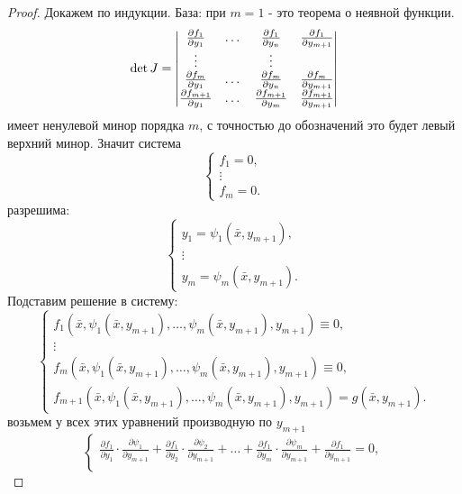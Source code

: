 \begin{proof}
    Докажем по индукции. База: при $m=1$ - это теорема о неявной функции.
    \[
        \det{J}=\begin{vmatrix}
            \frac{\partial {f_1}}{\partial {y_1}} & \dots & \frac{\partial {f_1}}{\partial {y_n}} & \frac{\partial {f_1}}{\partial {y_{m+1}}}\\
            \vdots & \null & \vdots\\
            \frac{\partial {f_m}}{\partial {y_1}} & \dots & \frac{\partial {f_m}}{\partial {y_n}} & \frac{\partial {f_m}}{\partial {y_{m+1}}}\\
            \frac{\partial {f_{m+1}}}{\partial {y_1}} & \dots & \frac{\partial {f_{m+1}}}{\partial {y_m}} & \frac{\partial {f_{m+1}}}{\partial {y_{m+1}}}
        \end{vmatrix}
    \]
    имеет ненулевой минор порядка $m$, с точностью до обозначений это будет левый верхний минор. Значит система
    \[\begin{cases}
        f_1 = 0,\\
        \vdots\\
        f_m=0.
    \end{cases}
    \]
    разрешима:
    \[\begin{cases}
        y_1=\psi_1(\bar{x},y_{m+1}),\\
        \vdots\\
        y_m=\psi_m(\bar{x}, y_{m+1}).
    \end{cases}
    \]
    Подставим решение в систему:
    \[\begin{cases}
        f_1(\bar{x}, \psi_1(\bar{x}, y_{m+1}), \dots, \psi_m(\bar{x}, y_{m+1}), y_{m+1})\equiv 0,\\
        \vdots\\
        f_m(\bar{x}, \psi_1(\bar{x}, y_{m+1}), \dots, \psi_m(\bar{x}, y_{m+1}), y_{m+1})\equiv 0,\\
        f_{m+1}(\bar{x}, \psi_1(\bar{x}, y_{m+1}),\dots,\psi_m(\bar{x}, y_{m+1}), y_{m+1})=g(\bar{x}, y_{m+1}).
    \end{cases}
    \]
    возьмем у всех этих уравнений производную по $y_{m+1}$
    \[\begin{cases}
        \frac{\partial {f_1}}{\partial {y_1}}\cdot \frac{\partial {\psi_1}}{\partial {y_{m+1}}}+\frac{\partial {f_1}}{\partial {y_2}}\cdot \frac{\partial {\psi_2}}{\partial {y_{m+1}}}+ \dots +\frac{\partial {f_1}}{\partial {y_m}}\cdot \frac{\partial {\psi_m}}{\partial {y_{m+1}}}+\frac{\partial {f_1}}{\partial {y_{m+1}}}=0,\\

\end{cases}\]
\end{proof}
